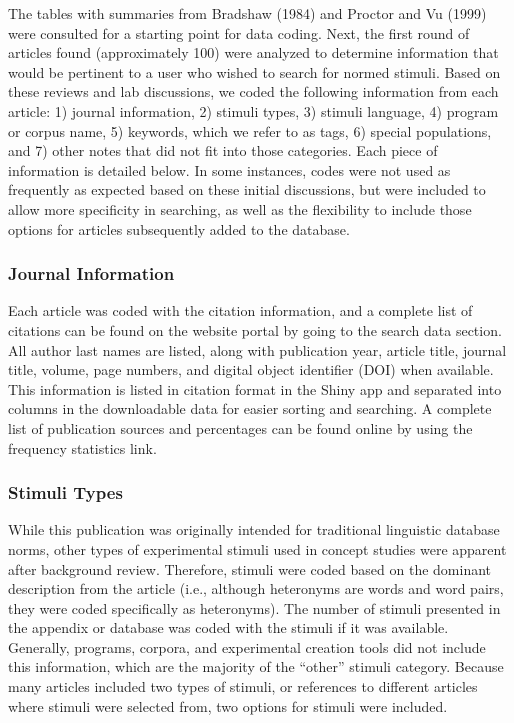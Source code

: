 \documentclass[english,,man]{apa6}
\theoremstyle{definition}
\theoremstyle{definition}
\theoremstyle{definition}
\theoremstyle{remark}
\begin{document}
The tables with summaries from Bradshaw (1984) and Proctor and Vu (1999)
were consulted for a starting point for data coding. Next, the first
round of articles found (approximately 100) were analyzed to determine
information that would be pertinent to a user who wished to search for
normed stimuli. Based on these reviews and lab discussions, we coded the
following information from each article: 1) journal information, 2)
stimuli types, 3) stimuli language, 4) program or corpus name, 5)
keywords, which we refer to as tags, 6) special populations, and 7)
other notes that did not fit into those categories. Each piece of
information is detailed below. In some instances, codes were not used as
frequently as expected based on these initial discussions, but were
included to allow more specificity in searching, as well as the
flexibility to include those options for articles subsequently added to
the database.

\hypertarget{journal-information}{%
\subsubsection{Journal Information}\label{journal-information}}

Each article was coded with the citation information, and a complete
list of citations can be found on the website portal by going to the
search data section. All author last names are listed, along with
publication year, article title, journal title, volume, page numbers,
and digital object identifier (DOI) when available. This information is
listed in citation format in the Shiny app and separated into columns in
the downloadable data for easier sorting and searching. A complete list
of publication sources and percentages can be found online by using the
frequency statistics link.

\hypertarget{stimuli-types}{%
\subsubsection{Stimuli Types}\label{stimuli-types}}

While this publication was originally intended for traditional
linguistic database norms, other types of experimental stimuli used in
concept studies were apparent after background review. Therefore,
stimuli were coded based on the dominant description from the article
(i.e., although heteronyms are words and word pairs, they were coded
specifically as heteronyms). The number of stimuli presented in the
appendix or database was coded with the stimuli if it was available.
Generally, programs, corpora, and experimental creation tools did not
include this information, which are the majority of the \enquote{other}
stimuli category. Because many articles included two types of stimuli,
or references to different articles where stimuli were selected from,
two options for stimuli were included.
\end{document}

